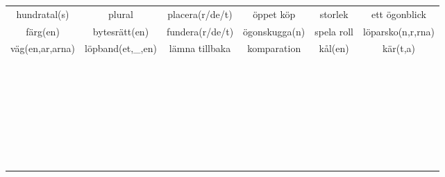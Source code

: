 \begin{center}
\begin{adjustwidth}{-2cm}{}
\begin{tabular}{|c c c c c c|}
            hundratal(s) & plural & placera(r/de/t) & öppet köp & storlek & ett ögonblick \\
            färg(en) & bytesrätt(en) & fundera(r/de/t) & ögonskugga(n) & spela roll & löparsko(n,r,rna) \\
            väg(en,ar,arna) & löpband(et,\_,en) & lämna tillbaka & komparation & kål(en) & kär(t,a) \\
             &  &  &  &  &  \\
             &  &  &  &  &  \\
             &  &  &  &  &  \\
             &  &  &  &  &  \\
             &  &  &  &  &  \\
             &  &  &  &  &  \\
             &  &  &  &  &  \\
             &  &  &  &  &  \\
             &  &  &  &  &  \\
             &  &  &  &  &  \\
             &  &  &  &  &  \\
             &  &  &  &  &  \\
             &  &  &  &  &  \\
             &  &  &  &  &  \\
             &  &  &  &  &  \\
             &  &  &  &  &  \\
             &  &  &  &  &  \\
             &  &  &  &  &  \\
             &  &  &  &  &  \\
             &  &  &  &  &  \\
             &  &  &  &  &  \\
             &  &  &  &  &  \\
             &  &  &  &  &  \\
             &  &  &  &  &  \\
             &  &  &  &  &  \\
             &  &  &  &  &  \\
             &  &  &  &  &  \\
             &  &  &  &  &  \\
             &  &  &  &  &  \\
             &  &  &  &  &  \\
             &  &  &  &  &  \\

\end{tabular}
\end{adjustwidth}
\end{center}
